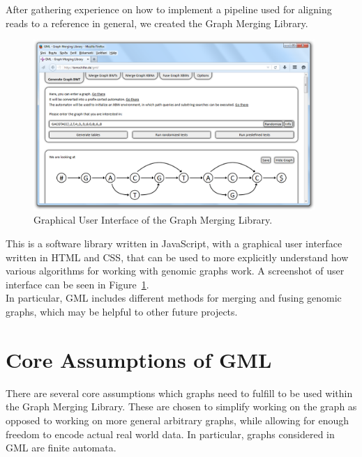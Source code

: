 \documentclass[a4paper,12pt,twoside,BCOR=10mm]{scrbook}
\begin{document}
After gathering experience on how to implement a pipeline used for aligning reads to a reference in general,
we created the Graph Merging Library.
\begin{figure}[!htb]
\centering
\includegraphics[width=0.95\textwidth]{evo_gml_3.png}
\caption[GUI of the Graph Merging Library]{Graphical User Interface of the Graph Merging Library.} \label{fig:evo_gml_3}
\end{figure}
This is a software library written in JavaScript, with a graphical user interface written in HTML and CSS,
that can be used to more explicitly understand how various algorithms for working with genomic graphs work.
A screenshot of user interface can be seen in Figure~\ref{fig:evo_gml_3}. \\
In particular, GML includes different methods for merging and fusing genomic graphs,
which may be helpful to other future projects.

\section{Core Assumptions of GML}
\label{sec:gml_core_assumptions}
%

There are several core assumptions which graphs need to fulfill to be used within the Graph Merging Library.
These are chosen to simplify working on the graph as opposed to working on more general arbitrary graphs,
while allowing for enough freedom to encode actual real world data.
In particular, graphs considered in GML are finite automata.
\end{document}
